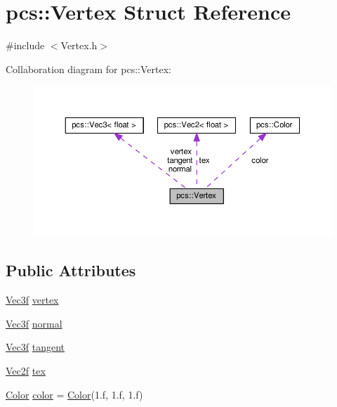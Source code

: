 \hypertarget{structpcs_1_1Vertex}{}\section{pcs\+:\+:Vertex Struct Reference}
\label{structpcs_1_1Vertex}


{\ttfamily \#include $<$Vertex.\+h$>$}



Collaboration diagram for pcs\+:\+:Vertex\+:\nopagebreak
\begin{figure}[H]
\begin{center}
\leavevmode
\includegraphics[width=350pt]{structpcs_1_1Vertex__coll__graph}
\end{center}
\end{figure}
\subsection*{Public Attributes}
\begin{DoxyCompactItemize}
\item 
\hyperlink{namespacepcs_a68e0f517680976c17c810ffe6952cbab}{Vec3f} \hyperlink{structpcs_1_1Vertex_aa6f993972cb0df9e496c0cc7651f52e4}{vertex}
\item 
\hyperlink{namespacepcs_a68e0f517680976c17c810ffe6952cbab}{Vec3f} \hyperlink{structpcs_1_1Vertex_a1abb0fd8ae332df1bfb694123cffff07}{normal}
\item 
\hyperlink{namespacepcs_a68e0f517680976c17c810ffe6952cbab}{Vec3f} \hyperlink{structpcs_1_1Vertex_aa12c076f0bf13806b94d507e9cfc8495}{tangent}
\item 
\hyperlink{namespacepcs_a4b2fd718bd0800b6aa492b1c60f19edc}{Vec2f} \hyperlink{structpcs_1_1Vertex_ab2509ec06f0fab076c12fce41fa9470a}{tex}
\item 
\hyperlink{structpcs_1_1Color}{Color} \hyperlink{structpcs_1_1Vertex_a1f6237a5bab122ebf40abebac1f0688e}{color} = \hyperlink{structpcs_1_1Color}{Color}(1.f, 1.f, 1.f)
\end{DoxyCompactItemize}
